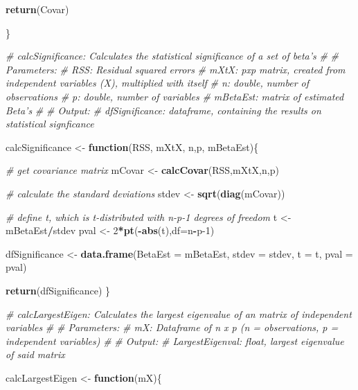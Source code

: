 \documentclass[
]{article}
\newenvironment{Shaded}{\begin{snugshade}}{\end{snugshade}}
\newcommand{\CommentTok}[1]{\textcolor[rgb]{0.56,0.35,0.01}{\textit{#1}}}
\newcommand{\ControlFlowTok}[1]{\textcolor[rgb]{0.13,0.29,0.53}{\textbf{#1}}}
\newcommand{\DataTypeTok}[1]{\textcolor[rgb]{0.13,0.29,0.53}{#1}}
\newcommand{\DecValTok}[1]{\textcolor[rgb]{0.00,0.00,0.81}{#1}}
\newcommand{\KeywordTok}[1]{\textcolor[rgb]{0.13,0.29,0.53}{\textbf{#1}}}
\newcommand{\NormalTok}[1]{#1}
\newcommand{\OperatorTok}[1]{\textcolor[rgb]{0.81,0.36,0.00}{\textbf{#1}}}
\newcommand{\StringTok}[1]{\textcolor[rgb]{0.31,0.60,0.02}{#1}}
\begin{document}
\begin{Shaded}
\begin{Highlighting}[]
{{  \KeywordTok{return}\NormalTok{(Covar)}
  
\NormalTok{\}}

\CommentTok{# calcSignificance: Calculates the statistical significance of a set of beta's}
\CommentTok{#}
\CommentTok{# Parameters: }
\CommentTok{#   RSS: Residual squared errors}
\CommentTok{#   mXtX: pxp matrix, created from independent variables (X), multiplied with itself}
\CommentTok{#   n: double, number of observations}
\CommentTok{#   p: double, number of variables}
\CommentTok{#   mBetaEst: matrix of estimated Beta's}
\CommentTok{#}
\CommentTok{# Output:}
\CommentTok{#   dfSignificance: dataframe, containing the results on statistical signficance}

\NormalTok{calcSignificance <-}\StringTok{ }\ControlFlowTok{function}\NormalTok{(RSS, mXtX, n,p, mBetaEst)\{}
  
  \CommentTok{# get covariance matrix}
\NormalTok{  mCovar <-}\StringTok{ }\KeywordTok{calcCovar}\NormalTok{(RSS,mXtX,n,p)}
  
  \CommentTok{# calculate the standard deviations}
\NormalTok{  stdev <-}\StringTok{ }\KeywordTok{sqrt}\NormalTok{(}\KeywordTok{diag}\NormalTok{(mCovar))}
  
  \CommentTok{# define t, which is t-distributed with n-p-1 degrees of freedom }
\NormalTok{  t <-}\StringTok{ }\NormalTok{mBetaEst}\OperatorTok{/}\NormalTok{stdev}
\NormalTok{  pval <-}\StringTok{ }\DecValTok{2}\OperatorTok{*}\KeywordTok{pt}\NormalTok{(}\OperatorTok{-}\KeywordTok{abs}\NormalTok{(t),}\DataTypeTok{df=}\NormalTok{n}\OperatorTok{-}\NormalTok{p}\DecValTok{-1}\NormalTok{)}
  
\NormalTok{  dfSignificance <-}\StringTok{ }\KeywordTok{data.frame}\NormalTok{(}\DataTypeTok{BetaEst =}\NormalTok{ mBetaEst, }
                               \DataTypeTok{stdev =}\NormalTok{ stdev, }
                               \DataTypeTok{t =}\NormalTok{ t, }
                               \DataTypeTok{pval =}\NormalTok{ pval)}
  
  \KeywordTok{return}\NormalTok{(dfSignificance)}
\NormalTok{\}}

\CommentTok{# calcLargestEigen: Calculates the largest eigenvalue of an matrix of independent variables}
\CommentTok{# }
\CommentTok{# Parameters: }
\CommentTok{#   mX: Dataframe of n x p (n = observations, p = independent variables)}
\CommentTok{#   }
\CommentTok{# Output:}
\CommentTok{#   LargestEigenval: float, largest eigenvalue of said matrix}

\NormalTok{calcLargestEigen <-}\StringTok{ }\ControlFlowTok{function}\NormalTok{(mX)\{}
  
}}
\end{Highlighting}
\end{Shaded}
\end{document}
